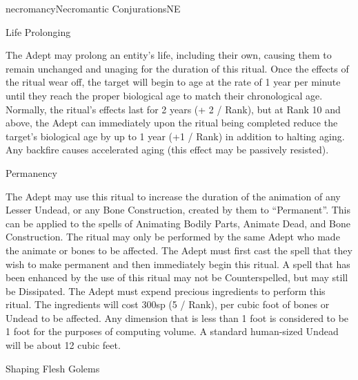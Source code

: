 \begin{College}[1.1]{necromancy}{Necromantic Conjurations}{NE}
\begin{ritual}[R-2]{Life Prolonging}

\begin{effects}
The Adept may prolong an entity’s life, including their own, causing
them to remain unchanged and unaging for the duration of this ritual.
Once the effects of the ritual wear off, the target will begin to age
at the rate of 1 year per minute until they reach the proper
biological age to match their chronological age.  Normally, the
ritual’s effects last for 2 years (+ 2 / Rank), but at Rank 10 and
above, the Adept can immediately upon the ritual being completed
reduce the target’s biological age by up to 1 year (+1 / Rank) in
addition to halting aging.  Any backfire causes accelerated aging
(this effect may be passively resisted).
\end{effects}
\end{ritual}

\begin{ritual}[R-3]{Permanency}

\begin{effects}
The Adept may use this ritual to increase the duration of the
animation of any Lesser Undead, or any Bone Construction, created by
them to “Permanent”.  This can be applied to the spells of Animating
Bodily Parts, Animate Dead, and Bone Construction. The ritual may only
be performed by the same Adept who made the animate or bones to be
affected. The Adept must first cast the spell that they wish to make
permanent and then immediately begin this ritual.  A spell that has
been enhanced by the use of this ritual may not be Counterspelled,
but may still be Dissipated.  The Adept must expend precious
ingredients to perform this ritual.  The ingredients will cost 300sp
(5 / Rank), per cubic foot of bones or Undead to be affected.  Any
dimension that is less than 1 foot is considered to be 1 foot for the
purposes of computing volume.  A standard human-sized Undead will be
about 12 cubic feet.
\end{effects}
\end{ritual}

\begin{ritual}[R-4]{Shaping Flesh Golems}


\end{ritual}
\end{College}
